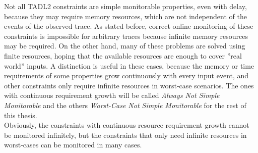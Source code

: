 	
		Not all TADL2 constraints are simple monitorable properties, even with delay, because they may require memory resources, which are not independent of the events of the observed trace. As stated before, correct online monitoring of these constraints is impossible for arbitrary traces because infinite memory resources may be required. On the other hand, many of these problems are solved using finite resources, hoping that the available resources are enough to cover ''real world'' inputs.
		A distinction is useful in these cases, because the memory or time requirements of some properties grow continuously with every input event, and other constraints only require infinite resources in worst-case scenarios. 
		The ones with continuous requirement growth will be called \emph{Always Not Simple Monitorable} and the others \emph{Worst-Case Not Simple Monitorable} for the rest of this thesis.\\
		Obviously, the constraints with continuous resource requirement growth cannot be monitored infinitely, but the constraints that only need infinite resources in worst-cases can be monitored in many cases.

	 